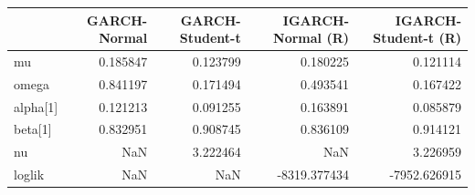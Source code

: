 \begin{table}[htbp]
\centering
\begin{tabular}{lrrrr}
\toprule
 & GARCH-Normal & GARCH-Student-t & IGARCH-Normal (R) & IGARCH-Student-t (R) \\
\midrule
mu & 0.185847 & 0.123799 & 0.180225 & 0.121114 \\
omega & 0.841197 & 0.171494 & 0.493541 & 0.167422 \\
alpha[1] & 0.121213 & 0.091255 & 0.163891 & 0.085879 \\
beta[1] & 0.832951 & 0.908745 & 0.836109 & 0.914121 \\
nu & NaN & 3.222464 & NaN & 3.226959 \\
loglik & NaN & NaN & -8319.377434 & -7952.626915 \\
\bottomrule
\end{tabular}
\label{tab:baseline_garch_igarch_params}
\end{table}
